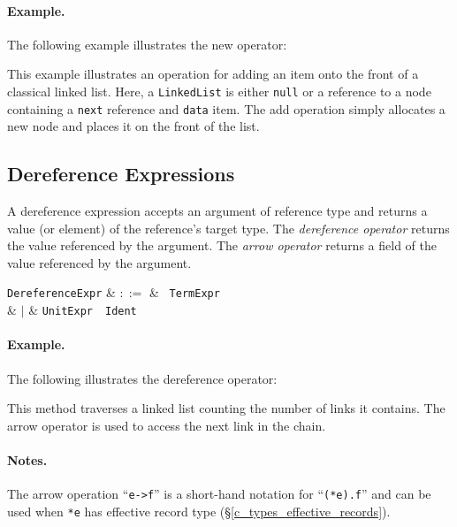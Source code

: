 \paragraph{Example.} The following example illustrates the new operator:



This example illustrates an operation for adding an item onto the front of a classical linked list.  Here, a \lstinline{LinkedList} is either \lstinline{null} or a reference to a node containing a \lstinline{next} reference and \lstinline{data} item.  The add operation simply allocates a new node and places it on the front of the list.


\subsection{Dereference Expressions}
\label{c_expr_dereference}

A dereference expression accepts an argument of reference type and returns a value (or element) of the reference's target type.  The {\em dereference operator} returns the value referenced by the argument.  The {\em arrow operator} returns a field of the value referenced by the argument.

\begin{syntax}
  \verb+DereferenceExpr+ & $::=$ & \token{*}\ \verb+TermExpr+\\
  & $|$ & \verb+UnitExpr+\ \token{->}\ \verb+Ident+\\
\end{syntax}

\paragraph{Example.} The following illustrates the dereference operator:



This method traverses a linked list counting the number of links it contains.  The arrow operator is used to access the next link in the chain.

\paragraph{Notes.} The arrow operation ``\lstinline{e->f}'' is a short-hand notation for ``\lstinline{(*e).f}'' and can be used when \lstinline{*e} has effective record type (\S\ref{c_types_effective_records}).


